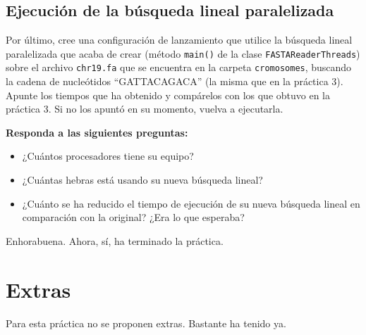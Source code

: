 \documentclass[10pt,a4paper,spanish]{article}
\newcommand{\code}[1]{\texttt{#1}}
\begin{document}
\subsection{Ejecución de la búsqueda lineal paralelizada}

Por último, cree una configuración de lanzamiento que utilice la búsqueda lineal paralelizada que acaba de crear (método \code{main()} de la clase \code{FASTAReaderThreads}) sobre el archivo \code{chr19.fa} que se encuentra en la carpeta \code{cromosomes}, buscando la cadena de nucleótidos ``GATTACAGACA'' (la misma que en la práctica 3). Apunte los tiempos que ha obtenido y compárelos con los que obtuvo en la práctica 3. Si no los apuntó en su momento, vuelva a ejecutarla.

\textbf{Responda a las siguientes preguntas:}

\begin{itemize}
    \item ¿Cuántos procesadores tiene su equipo?
    \item ¿Cuántas hebras está usando su nueva búsqueda lineal?
    \item ¿Cuánto se ha reducido el tiempo de ejecución de su nueva búsqueda lineal en comparación con la original? ¿Era lo que esperaba?
\end{itemize}

Enhorabuena. Ahora, sí, ha terminado la práctica.

\section{Extras} 

Para esta práctica no se proponen extras. Bastante ha tenido ya.
\end{document}
